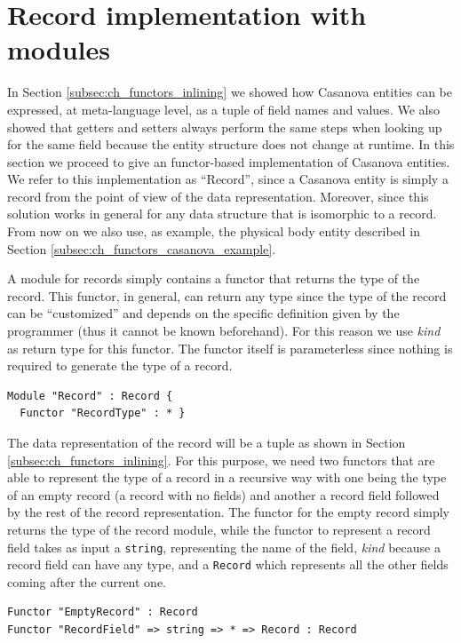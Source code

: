\section{Record implementation with modules}
\label{sec:ch_functors_record_implementation}
In Section \ref{subsec:ch_functors_inlining} we showed how Casanova entities can be expressed, at meta-language level, as a tuple of field names and values. We also showed that getters and setters always perform the same steps when looking up for the same field because the entity structure does not change at runtime. In this section we proceed to give an functor-based implementation of Casanova entities. We refer to this implementation as ``Record'', since a Casanova entity is simply a record from the point of view of the data representation. Moreover, since this solution works in general for any data structure that is isomorphic to a record. From now on we also use, as example, the physical body entity described in Section \ref{subsec:ch_functors_casanova_example}.

A module for records simply contains a functor that returns the type of the record. This functor, in general, can return any type since the type of the record can be ``customized'' and depends on the specific definition given by the programmer (thus it cannot be known beforehand). For this reason we use \textit{kind} as return type for this functor. The functor itself is parameterless since nothing is required to generate the type of a record.

\begin{lstlisting}
Module "Record" : Record {
  Functor "RecordType" : * }
\end{lstlisting}

The data representation of the record will be a tuple as shown in Section \ref{subsec:ch_functors_inlining}. For this purpose, we need two functors that are able to represent the type of a record in a recursive way with one being the type of an empty record (a record with no fields) and another a record field followed by the rest of the record representation. The functor for the empty record simply returns the type of the record module, while the functor to represent a record field takes as input a \texttt{string}, representing the name of the field, \textit{kind} because a record field can have any type, and a \texttt{Record} which represents all the other fields coming after the current one. 

\begin{lstlisting}
Functor "EmptyRecord" : Record
Functor "RecordField" => string => * => Record : Record
\end{lstlisting}

